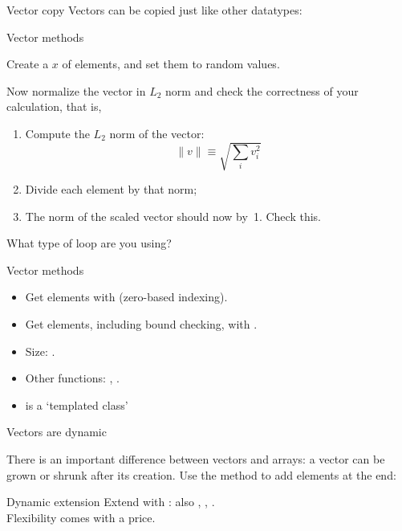 \begin{block}{Vector copy}
  \label{sl:vectorcopy}
  Vectors can be copied just like other datatypes:
\end{block}

 {Vector methods}

\begin{exercise}
  \label{ex:vectornormalize}
  Create a  $x$ of  elements, and set them to random
  values.

  Now normalize the vector in $L_2$ norm and check the correctness of
  your calculation, that is,
  \begin{enumerate}
  \item Compute the $L_2$ norm of the vector:
    \[ \| v\| \equiv \sqrt{\sum_iv_i^2} \]
  \item Divide each element by that norm;
  \item The norm of the scaled vector should now by~1. Check this.
  \end{enumerate}
  What type of loop are you using?
\end{exercise}

\begin{slide}{Vector methods}
  \label{sl:vector-method}
  \begin{itemize}
  \item Get elements with  (zero-based indexing).
  \item Get elements, including bound checking, with .
  \item Size: .
  \item Other functions: , .
  \item {} is a `templated class'
  \end{itemize}
\end{slide}

 {Vectors are dynamic}
\label{sec:stdvector-dynamic}

There is an important difference between vectors and arrays: a vector
can be grown or shrunk after its creation.
Use the  method to add elements at the end:

\begin{block}{Dynamic extension}
  \label{sl:vector-dynamic}
  Extend with :
  also , , .\\
  Flexibility comes with a price.
\end{block}


